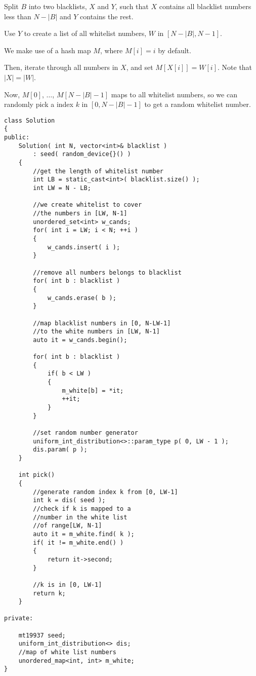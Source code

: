 Split $B$ into two blacklists, $X$ and $Y$, such that $X$ contains all blacklist numbers less than $N−\lvert B\rvert$ and $Y$ contains the rest.

Use $Y$ to create a list of all whitelist numbers, $W$ in $[N−\lvert B\rvert, N-1]$.

We make use of a hash map $M$, where $M[i]=i$ by default.

Then, iterate through all numbers in $X$, and set $M[X[i]]=W[i]$. Note that $\lvert X\rvert=\rvert W\lvert$.

Now, $M[0]$, $\ldots$, $M[N−\lvert B\rvert−1]$ maps to all whitelist numbers, so we can randomly pick a index $k$ in $[0,N-\lvert B\rvert-1]$ to get a random whitelist number.

\begin{lstlisting}[style=customc, caption={Re-map}]
class Solution
{
public:
    Solution( int N, vector<int>& blacklist )
        : seed( random_device{}() )
    {
        //get the length of whitelist number
        int LB = static_cast<int>( blacklist.size() );
        int LW = N - LB;

        //we create whitelist to cover
        //the numbers in [LW, N-1]
        unordered_set<int> w_cands;
        for( int i = LW; i < N; ++i )
        {
            w_cands.insert( i );
        }

        //remove all numbers belongs to blacklist
        for( int b : blacklist )
        {
            w_cands.erase( b );
        }

        //map blacklist numbers in [0, N-LW-1]
        //to the white numbers in [LW, N-1]
        auto it = w_cands.begin();

        for( int b : blacklist )
        {
            if( b < LW )
            {
                m_white[b] = *it;
                ++it;
            }
        }

        //set random number generator
        uniform_int_distribution<>::param_type p( 0, LW - 1 );
        dis.param( p );
    }

    int pick()
    {
        //generate random index k from [0, LW-1]
        int k = dis( seed );
        //check if k is mapped to a
        //number in the white list
        //of range[LW, N-1]
        auto it = m_white.find( k );
        if( it != m_white.end() )
        {
            return it->second;
        }

        //k is in [0, LW-1]
        return k;
    }

private:

    mt19937 seed;
    uniform_int_distribution<> dis;
    //map of white list numbers
    unordered_map<int, int> m_white;
}
\end{lstlisting}